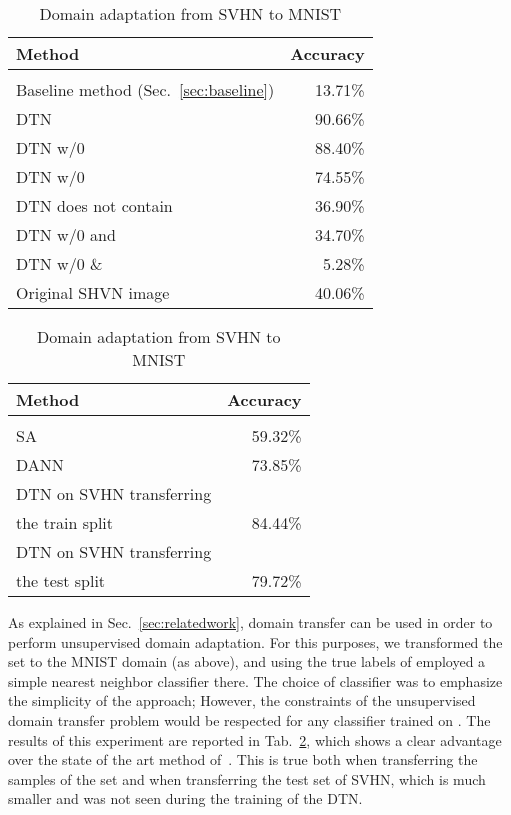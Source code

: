 \documentclass{article} \usepackage{iclr2017_conference,times}
\begin{document}
\begin{table}[t]
    \begin{minipage}{.5\linewidth}
      \caption{\label{tab:comparemnist} Accuracy of the MNIST classifier on the sampled transferred by our DTN method from SHVN to MNIST.}
      \centering
       \begin{tabular}{lr}
Method & Accuracy \\ \hline \\
Baseline method (Sec.~\ref{sec:baseline})         & 13.71\% \\
\hline
DTN     & {90.66}\%  \\
DTN w/0   & 88.40\%  \\
DTN w/0   & 74.55\%  \\
DTN  does not contain   & 36.90\%  \\
DTN w/0  and   & 34.70\% \\
DTN w/0  \&    &  5.28\%  \\
\hline
Original SHVN image & 40.06\% \\
\hline
\end{tabular}
    \end{minipage}
\hspace{.4cm}
\begin{minipage}{.40\linewidth}
      \centering
        \caption{\label{tab:domaintransfer}Domain adaptation from SVHN to MNIST}
       \begin{tabular}{lr}
Method & Accuracy \\ \hline \\
SA~\citet{fernando} & 59.32\%\\
DANN~\citet{domaingan} & 73.85\%\\
DTN on SVHN transferring\\
the train split  & 84.44\%\\
DTN on SVHN transferring\\
the test split & 79.72\%\\
\hline
\end{tabular}
\vspace{.44567847905in}
\end{minipage} 
\end{table}

As explained in Sec.~\ref{sec:relatedwork}, domain transfer can be used in order to perform unsupervised domain adaptation. For this purposes, we transformed the set  to the MNIST domain (as above), and using the true labels of  employed a simple nearest neighbor classifier there. The choice of classifier was to emphasize the simplicity of the approach; However, the constraints of the unsupervised domain transfer problem would be respected for any classifier trained on . The results of this experiment are reported in Tab.~\ref{tab:domaintransfer}, which shows a clear advantage over the state of the art method of~\cite{domaingan}. This is true both when transferring the samples of the set  and when transferring the test set of SVHN, which is much smaller and was not seen during the training of the DTN.
\end{document}
